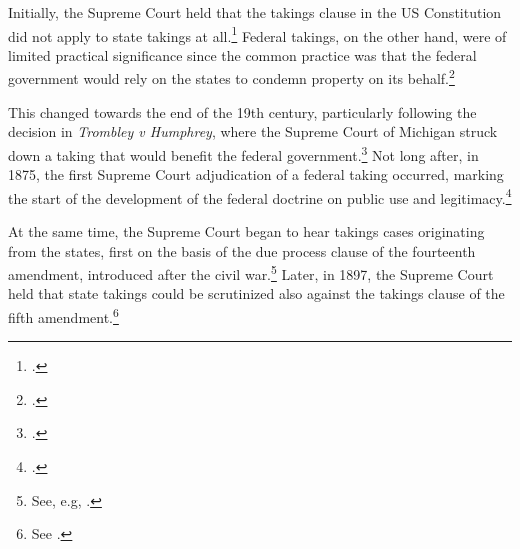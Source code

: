 Initially, the Supreme Court held that the takings clause in the US Constitution did not apply to state takings at all.\footcite{barron33} Federal takings, on the other hand, were of limited practical significance since the common practice was that the federal government would rely on the states to condemn property on its behalf.\footcite[30]{meidinger80}

This changed towards the end of the 19th century, particularly following the decision in {\it Trombley v Humphrey}, where the Supreme Court of Michigan struck down a taking that would benefit the federal government.\footcite{trombley71} Not long after, in 1875, the first Supreme Court adjudication of a federal taking occurred, marking the start of the development of the federal doctrine on public use and legitimacy.\footcite{kohl75} 

At the same time, the Supreme Court began to hear takings cases originating from the states, first on the basis of the due process clause of the fourteenth amendment, introduced after the civil war.\footnote{See, e.g, \cite{head85}.} Later, in 1897, the Supreme Court held that state takings could be scrutinized also against the takings clause of the fifth amendment.\footnote{See \cite{chicago97}.}

